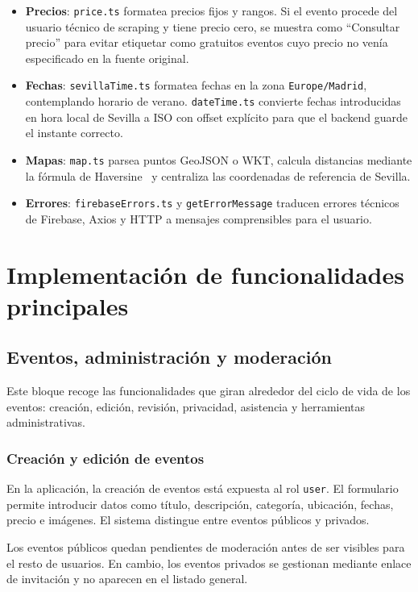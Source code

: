 \begin{itemize}
    \item \textbf{Precios}: \texttt{price.ts} formatea precios fijos y rangos. Si el evento procede del usuario técnico de scraping y tiene precio cero, se muestra como ``Consultar precio'' para evitar etiquetar como gratuitos eventos cuyo precio no venía especificado en la fuente original.
    \item \textbf{Fechas}: \texttt{sevillaTime.ts} formatea fechas en la zona \texttt{Europe/Madrid}, contemplando horario de verano. \texttt{dateTime.ts} convierte fechas introducidas en hora local de Sevilla a ISO con offset explícito para que el backend guarde el instante correcto.
    \item \textbf{Mapas}: \texttt{map.ts} parsea puntos GeoJSON o WKT, calcula distancias mediante la fórmula de Haversine~\cite{robusto1957cosine} y centraliza las coordenadas de referencia de Sevilla.
    \item \textbf{Errores}: \texttt{firebaseErrors.ts} y \texttt{getErrorMessage} traducen errores técnicos de Firebase, Axios y HTTP a mensajes comprensibles para el usuario.
\end{itemize}

\section{Implementación de funcionalidades principales}

\subsection{Eventos, administración y moderación}

Este bloque recoge las funcionalidades que giran alrededor del ciclo de vida de los eventos: creación, edición, revisión, privacidad, asistencia y herramientas administrativas.

\subsubsection{Creación y edición de eventos}

En la aplicación, la creación de eventos está expuesta al rol \texttt{user}. El formulario permite introducir datos como título, descripción, categoría, ubicación, fechas, precio e imágenes. El sistema distingue entre eventos públicos y privados.

Los eventos públicos quedan pendientes de moderación antes de ser visibles para el resto de usuarios. En cambio, los eventos privados se gestionan mediante enlace de invitación y no aparecen en el listado general.

